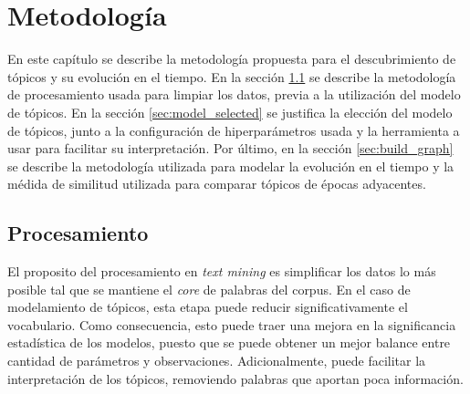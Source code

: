 \documentclass[letterpaper,12pt,oneside]{book} %
\begin{document}
\chapter{Metodología}
\label{ch:methodology}

En este capítulo se describe la metodología propuesta para el descubrimiento de tópicos y su evolución en el tiempo. En la sección \ref{sec:processing} se describe la metodología de procesamiento usada para limpiar los datos, previa a la utilización del modelo de tópicos. En la sección \ref{sec:model_selected} se justifica la elección del modelo de tópicos, junto a la configuración de hiperparámetros usada y la herramienta a usar para facilitar su interpretación. Por último, en la sección \ref{sec:build_graph} se describe la metodología utilizada para modelar la evolución en el tiempo y la médida de similitud utilizada para comparar tópicos de épocas adyacentes.

\section{Procesamiento}
\label{sec:processing}

El proposito del procesamiento en \textit{text mining} es simplificar los datos lo más posible tal que se mantiene el \textit{core} de palabras del corpus. En el caso de modelamiento de tópicos, esta etapa puede reducir significativamente el vocabulario. Como consecuencia, esto puede traer una mejora en la significancia estadística de los modelos, puesto que se puede obtener un mejor balance entre cantidad de parámetros y observaciones. Adicionalmente, puede facilitar la interpretación de los tópicos, removiendo palabras que aportan poca información.\\
\end{document}
